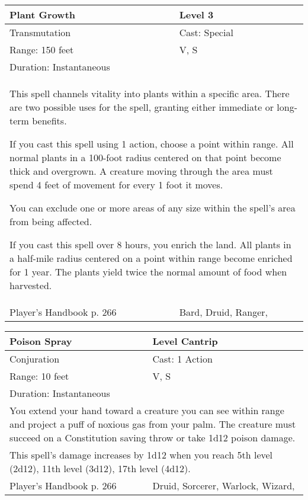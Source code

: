 \documentclass[11pt]{report}
\begin{document}
\begin{table}[H]
	\begin{tabular}{||p{6cm}|p{6cm}||}
		\hline\hline
		\bf{Plant Growth} & Level 3\\ \hline
		Transmutation & Cast: Special\\ \hline
		Range: 150 feet & V, S\\ \hline
		Duration: Instantaneous & \\ \hline
		\multicolumn{2}{||p{12cm}||}{This spell channels vitality into plants within a specific area. There are two possible uses for the spell, granting either immediate or long-term benefits.

If you cast this spell using 1 action, choose a point within range. All normal plants in a 100-foot radius centered on that point become thick and overgrown. A creature moving through the area must spend 4 feet of movement for every 1 foot it moves.

You can exclude one or more areas of any size within the spell’s area from being affected.

If you cast this spell over 8 hours, you enrich the land. All plants in a half-mile radius centered on a point within range become enriched for 1 year. The plants yield twice the normal amount of food when harvested.}\\ \hline
Player's Handbook p. 266 & Bard, Druid, Ranger, \\ \hline\hline
	\end{tabular}
\end{table}

\begin{table}[H]
	\begin{tabular}{||p{6cm}|p{6cm}||}
		\hline\hline
		\bf{Poison Spray} & Level Cantrip\\ \hline
		Conjuration & Cast: 1 Action\\ \hline
		Range: 10 feet & V, S\\ \hline
		Duration: Instantaneous & \\ \hline
		\multicolumn{2}{||p{12cm}||}{You extend your hand toward a creature you can see within range and project a puff of noxious gas from your palm. The creature must succeed on a Constitution saving throw or take 1d12 poison damage.}\\ \hline
		\multicolumn{2}{||p{12cm}||}{This spell’s damage increases by 1d12 when you reach 5th level (2d12), 11th level (3d12), 17th level (4d12).}\\ \hline
Player's Handbook p. 266 & Druid, Sorcerer, Warlock, Wizard, \\ \hline\hline
	\end{tabular}
\end{table}
\end{document}
